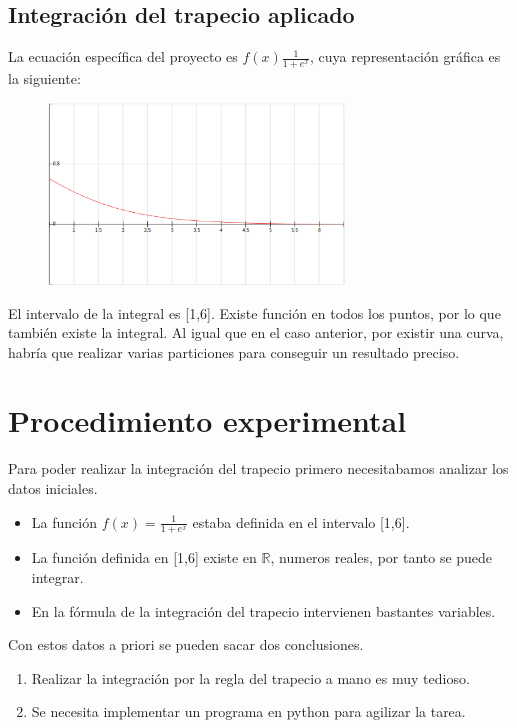 \documentclass{article}
\begin{document}
    \subsection{Integración del trapecio aplicado}
      
    La ecuación específica del proyecto es $f(x)\frac{1}{1+e^x}$, cuya representación gráfica es la siguiente:
     
     \begin{figure}[h]
      \begin{center}
         \includegraphics[width=0.7\textwidth]{img4.eps}
      \end{center}
     \end{figure}

      El intervalo de la integral es [1,6]. Existe función en todos los puntos, por lo que también existe la integral. Al igual que en el caso anterior, por existir una curva, habría que realizar varias particiones para conseguir un resultado preciso.

   \pagebreak



   \section{Procedimiento experimental}
   Para poder realizar la integración del trapecio primero necesitabamos analizar los datos iniciales.
   \begin{itemize}
    \item La función $f(x)=\frac{1}{1+e^x}$ estaba definida en el intervalo [1,6].
    \item La función definida en [1,6] existe en $\mathbb{R}$, numeros reales, por tanto se puede integrar.
    \item En la fórmula de la integración del trapecio intervienen bastantes variables.
   \end{itemize}
   Con estos datos a priori se pueden sacar dos conclusiones.
     \begin{enumerate}
       \item Realizar la integración por la regla del trapecio a mano es muy tedioso.
       \item Se necesita implementar un programa en python para agilizar la tarea.
     \end{enumerate}
\end{document}
